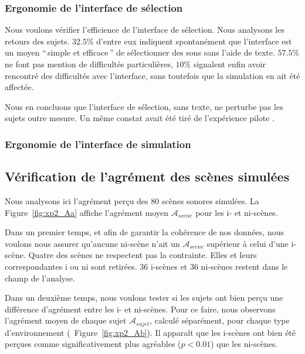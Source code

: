 \subsubsection{Ergonomie de l'interface de sélection}

Nous voulons vérifier l'efficience de l'interface de sélection. Nous analysons les retours des sujets. $32.5\%$ d'entre eux indiquent spontanément que l'interface est un moyen ``\,simple et efficace\,'' de sélectionner des sons sans l'aide de texte. $57.5\%$ ne font pas mention de difficultés particulières, $10\%$ signalent enfin avoir rencontré des difficultés avec l'interface, sans toutefois que la simulation en ait été affectée.

Nous en concluons que l'interface de sélection, sans texte, ne perturbe pas les sujets outre mesure. Un même constat avait été tiré de l'expérience pilote \citep{lafay2013atiam,lafay2014new}. \\


\subsubsection{Ergonomie de l'interface de simulation}

\subsection{Vérification de l'agrément des scènes simulées}

Nous analysons ici l'agrément perçu des $80$ scènes sonores simulées. La Figure~\ref{fig:xp2_Aa} affiche l'agrément moyen $\mathcal{A}_{scene}$ pour les i- et ni-scènes. 

Dans un premier temps, et afin de garantir la cohérence de nos données, nous voulons nous assurer qu'aucune ni-scène n'ait un $\mathcal{A}_{scene}$ supérieur à celui d'une i-scène. Quatre des scènes ne respectent pas la contrainte. Elles et leurs correspondantes i ou ni sont retirées. 36 i-scènes et 36 ni-scènes restent dans le champ de l'analyse.

Dans un deuxième temps, nous voulons tester si les sujets ont bien perçu une différence d'agrément entre les i- et ni-scènes. Pour ce faire, nous observons l'agrément moyen de chaque sujet $\mathcal{A}_{sujet}$, calculé séparément, pour chaque type d'environnement (\cf~Figure~\ref{fig:xp2_Ab}). Il apparaît que les i-scènes ont bien été perçues comme significativement plus agréables ($p<0.01$) que les ni-scènes.

